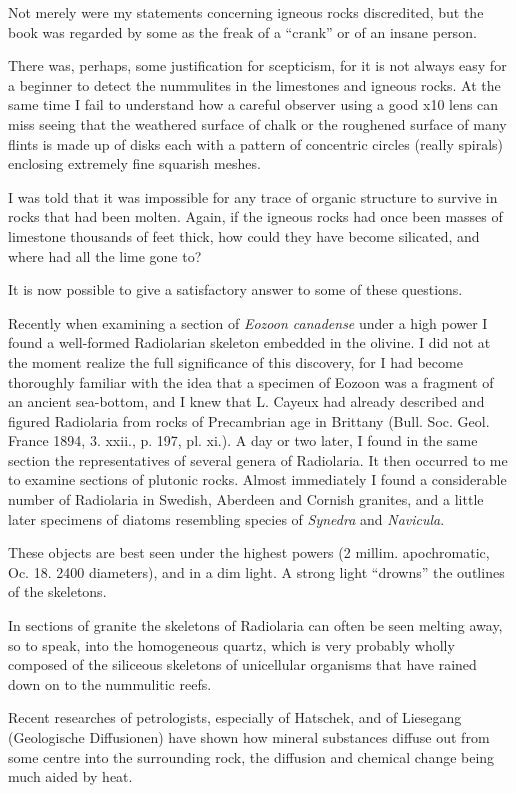 \documentclass[a4paper, 12pt, oneside]{article}
\begin{document}
Not merely were my statements concerning igneous rocks discredited, but the book was regarded by some as the freak of a ``crank'' or of an insane person.

There was, perhaps, some justification for scepticism, for it is not always easy for a beginner to detect the nummulites in the limestones and igneous rocks. At the same time I fail to understand how a careful observer using a good x10 lens can miss seeing that the weathered surface of chalk or the roughened surface of many flints is made up of disks each with a pattern of concentric circles (really spirals) enclosing extremely fine squarish meshes.

I was told that it was impossible for any trace of organic structure to survive in rocks that had been molten. Again, if the igneous rocks had once been masses of limestone thousands of feet thick, how could they have become silicated, and where had all the lime gone to?

It is now possible to give a satisfactory answer to some of these questions.

Recently when examining a section of \emph{Eozoon canadense} under a high power I found a well-formed Radiolarian skeleton embedded in the olivine. I did not at the moment realize the full significance of this discovery, for I had become thoroughly familiar with the idea that a specimen of Eozoon was a fragment of an ancient sea-bottom, and I knew that L. Cayeux had already described and figured Radiolaria from rocks of Precambrian age in Brittany (Bull. Soc. Geol. France 1894, 3. xxii., p. 197, pl. xi.). A day or two later, I found in the same section the representatives of several genera of Radiolaria. It then occurred to me to examine sections of plutonic rocks. Almost immediately I found a considerable number of Radiolaria in Swedish, Aberdeen and Cornish granites, and a little later specimens of diatoms resembling species of \emph{Synedra} and \emph{Navicula}.

These objects are best seen under the highest powers (2 millim. apochromatic, Oc. 18. 2400 diameters), and in a dim light. A strong light ``drowns'' the outlines of the skeletons.

In sections of granite the skeletons of Radiolaria can often be seen melting away, so to speak, into the homogeneous quartz, which is very probably wholly composed of the siliceous skeletons of unicellular organisms that have rained down on to the nummulitic reefs.

Recent researches of petrologists, especially of Hatschek, and of Liesegang (Geologische Diffusionen) have shown how mineral substances diffuse out from some centre into the surrounding rock, the diffusion and chemical change being much aided by heat.
\end{document}
